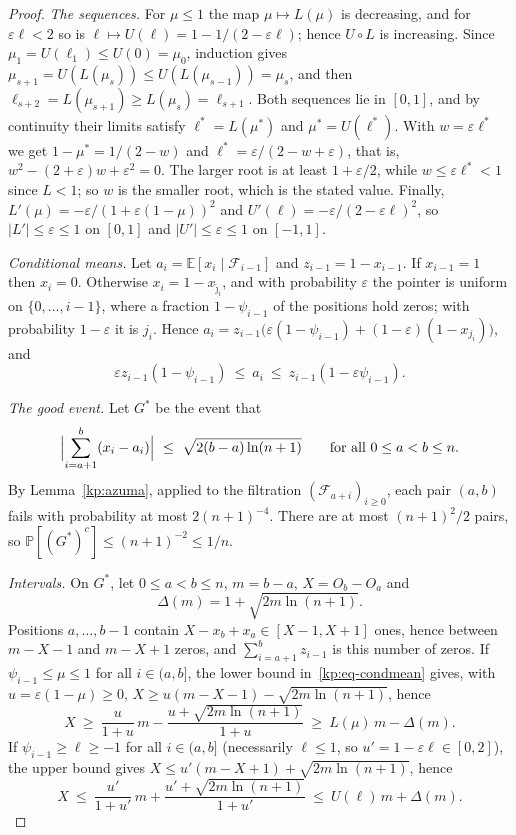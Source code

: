 \documentclass[11pt]{amsart}
\theoremstyle{definition}
\theoremstyle{remark}
\newcommand{\eps}{\varepsilon}
\newcommand{\jt}{\tilde{\jmath}}
\newcommand{\PP}{\mathbb{P}}
\newcommand{\EE}{\mathbb{E}}
\newcommand{\cF}{\mathcal{F}}
\begin{document}
\begin{proof}
\emph{The sequences.} For $\mu\le 1$ the map $\mu\mapsto L(\mu)$ is
decreasing, and for $\eps\ell<2$ so is $\ell\mapsto U(\ell)=1-1/(2-\eps\ell)$;
hence $U\circ L$ is increasing. Since $\mu_1=U(\ell_1)\le U(0)=\mu_0$, induction
gives $\mu_{s+1}=U(L(\mu_s))\le U(L(\mu_{s-1}))=\mu_s$, and then
$\ell_{s+2}=L(\mu_{s+1})\ge L(\mu_s)=\ell_{s+1}$. Both sequences lie in
$[0,1]$, and by continuity their limits satisfy $\ell^*=L(\mu^*)$ and
$\mu^*=U(\ell^*)$. With $w=\eps\ell^*$ we get $1-\mu^*=1/(2-w)$ and
$\ell^*=\eps/(2-w+\eps)$, that is, $w^2-(2+\eps)w+\eps^2=0$. The larger root is
at least $1+\eps/2$, while $w\le\eps\ell^*<1$ since $L<1$; so $w$ is the smaller
root, which is the stated value. Finally,
$L'(\mu)=-\eps/(1+\eps(1-\mu))^2$ and $U'(\ell)=-\eps/(2-\eps\ell)^2$, so
$|L'|\le\eps\le 1$ on $[0,1]$ and $|U'|\le\eps\le 1$ on $[-1,1]$.

\emph{Conditional means.} Let $a_i=\EE[x_i\mid\cF_{i-1}]$ and
$z_{i-1}=1-x_{i-1}$. If $x_{i-1}=1$ then $x_i=0$. Otherwise $x_i=1-x_{\jt_i}$,
and with probability $\eps$ the pointer is uniform on $\{0,\dots,i-1\}$, where
a fraction $1-\psi_{i-1}$ of the positions hold zeros; with probability
$1-\eps$ it is $j_i$. Hence
$a_i=z_{i-1}\bigl(\eps(1-\psi_{i-1})+(1-\eps)(1-x_{j_i})\bigr)$, and
\begin{equation}\label{kp:eq-condmean}
  \eps z_{i-1}(1-\psi_{i-1})\ \le\ a_i\ \le\ z_{i-1}(1-\eps\psi_{i-1}).
\end{equation}

\emph{The good event.} Let $G^*$ be the event that
\[
  \Bigl|\sum_{i=a+1}^{b}(x_i-a_i)\Bigr|\ \le\ \sqrt{2(b-a)\ln(n+1)}
  \qquad\text{for all } 0\le a<b\le n.
\]
By Lemma~\ref{kp:azuma}, applied to the filtration $(\cF_{a+i})_{i\ge 0}$, each
pair $(a,b)$ fails with probability at most $2(n+1)^{-4}$. There are at most
$(n+1)^2/2$ pairs, so $\PP[(G^*)^c]\le(n+1)^{-2}\le 1/n$.

\emph{Intervals.} On $G^*$, let $0\le a<b\le n$, $m=b-a$, $X=O_b-O_a$ and
\[
  \Delta(m)=1+\sqrt{2m\ln(n+1)} .
\]
Positions $a,\dots,b-1$ contain $X-x_b+x_a\in[X-1,X+1]$ ones, hence between
$m-X-1$ and $m-X+1$ zeros, and
$\sum_{i=a+1}^{b}z_{i-1}$ is this number of zeros. If $\psi_{i-1}\le\mu\le 1$
for all $i\in(a,b]$, the lower bound in~\eqref{kp:eq-condmean} gives, with
$u=\eps(1-\mu)\ge 0$,
$X\ge u(m-X-1)-\sqrt{2m\ln(n+1)}$, hence
\begin{equation}\label{kp:eq-int-lower}
  X\ \ge\ \frac{u}{1+u}\,m-\frac{u+\sqrt{2m\ln(n+1)}}{1+u}
  \ \ge\ L(\mu)\,m-\Delta(m).
\end{equation}
If $\psi_{i-1}\ge\ell\ge-1$ for all $i\in(a,b]$ (necessarily $\ell\le 1$, so
$u'=1-\eps\ell\in[0,2]$), the upper bound gives
$X\le u'(m-X+1)+\sqrt{2m\ln(n+1)}$, hence
\begin{equation}\label{kp:eq-int-upper}
  X\ \le\ \frac{u'}{1+u'}\,m+\frac{u'+\sqrt{2m\ln(n+1)}}{1+u'}
  \ \le\ U(\ell)\,m+\Delta(m).
\end{equation}


\end{proof}
\end{document}
